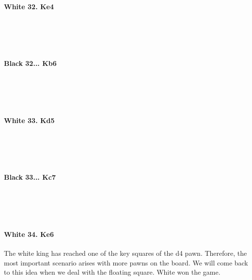 \documentclass{article}
\begin{document}
\\

\\
\\
\textbf{White 32. Ke4}\\
\\
\\
\\

\\
\\
\textbf{Black 32... Kb6}\\
\\
\\
\\

\\
\\
\textbf{White 33. Kd5}\\
\\
\\
\\

\\
\\
\textbf{Black 33... Kc7}\\
\\
\\
\\

\\
\\
\textbf{White 34. Ke6}\\
\\
The white king has reached one of the key squares of the d4 pawn. Therefore, the most important scenario arises with more pawns on the board. We will come back to this idea when we deal with the floating square. White won the game. 
\end{document}
